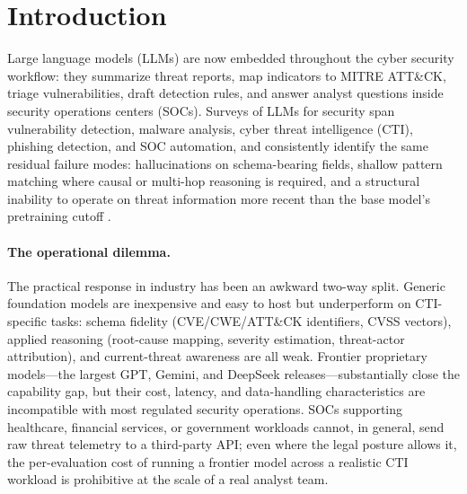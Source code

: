 \documentclass[unnumsec,webpdf,contemporary,large]{oup-authoring-template}
\theoremstyle{thmstyleone}
\theoremstyle{thmstyletwo}
\theoremstyle{thmstylethree}
\begin{document}


\maketitle

\section{Introduction}

Large language models (LLMs) are now embedded throughout the cyber security workflow: they summarize threat reports, map indicators to MITRE ATT\&CK, triage vulnerabilities, draft detection rules, and answer analyst questions inside security operations centers (SOCs). Surveys of LLMs for security span vulnerability detection, malware analysis, cyber threat intelligence (CTI), phishing detection, and SOC automation, and consistently identify the same residual failure modes: hallucinations on schema-bearing fields, shallow pattern matching where causal or multi-hop reasoning is required, and a structural inability to operate on threat information more recent than the base model's pretraining cutoff \cite{levi2024cyberpal,liu2024cyberbench}.

\paragraph{The operational dilemma.}
The practical response in industry has been an awkward two-way split. Generic foundation models are inexpensive and easy to host but underperform on CTI-specific tasks: schema fidelity (CVE/CWE/ATT\&CK identifiers, CVSS vectors), applied reasoning (root-cause mapping, severity estimation, threat-actor attribution), and current-threat awareness are all weak. Frontier proprietary models---the largest GPT, Gemini, and DeepSeek releases---substantially close the capability gap, but their cost, latency, and data-handling characteristics are incompatible with most regulated security operations. SOCs supporting healthcare, financial services, or government workloads cannot, in general, send raw threat telemetry to a third-party API; even where the legal posture allows it, the per-evaluation cost of running a frontier model across a realistic CTI workload is prohibitive at the scale of a real analyst team.
\end{document}
